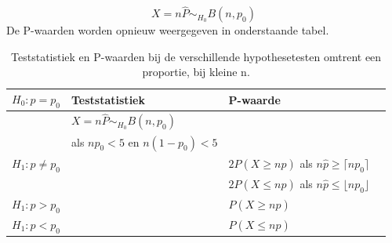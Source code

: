\documentclass[titlepage]{article}
\numberwithin{equation}{section}
\begin{document}
\begin{equation*}
	X = n\hat{P} \sim_{H_0} B(n,p_0)
\end{equation*}
De P-waarden worden opnieuw weergegeven in onderstaande tabel.
\begin{table}[H]
\centering
\begin{tabular}{llll}
$H_0: p =p_0$ & Teststatistiek & P-waarde\\ \hline
  & $X = n\hat{P} \sim_{H_0} B(n,p_0)$ & \\
  & als $np_0 < 5$ en $n(1-p_0)< 5$ & \\
$H_1: p \neq p_0$ & & $2P(X\geq n\hat{p})$ als $ n\hat{p} \geq\lceil np_0 \rceil$ \\
& & $2P(X\leq n\hat{p})$ als $ n\hat{p} \leq\lfloor np_0 \rfloor$ \\
$H_1 : p > p_0$ & & $P(X\geq n\hat{p})$ \\
$H_1: p < p_0$ & & $P(X\leq n\hat{p} )$               
\end{tabular}
\caption{Teststatistiek en P-waarden bij de verschillende hypothesetesten omtrent een proportie, bij kleine n.}
\end{table}
\end{document}
